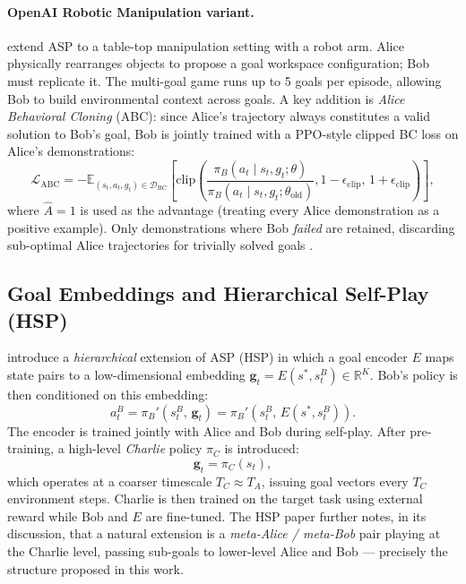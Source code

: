 \documentclass[12pt, a4paper]{article}
\newcommand{\sstar}{s^{*}}
\newcommand{\Enc}{E}
\newcommand{\goalvec}{\mathbf{g}}
\newcommand{\RR}{\mathbb{R}}
\newcommand{\calL}{\mathcal{L}}
\newcommand{\calD}{\mathcal{D}}
\begin{document}
\paragraph{OpenAI Robotic Manipulation variant.}
\citet{plappert2021asymmetric} extend ASP to a table-top manipulation setting with a robot
arm. Alice physically rearranges objects to propose a goal workspace configuration; Bob must
replicate it. The multi-goal game runs up to 5 goals per episode, allowing Bob to build
environmental context across goals. A key addition is \emph{Alice Behavioral Cloning} (ABC):
since Alice's trajectory always constitutes a valid solution to Bob's goal, Bob is jointly
trained with a PPO-style clipped BC loss on Alice's demonstrations:
\begin{equation}
    \calL_{\mathrm{ABC}} = -\mathbb{E}_{(s_t,a_t,g_t)\in\calD_{\mathrm{BC}}}
    \left[
        \mathrm{clip}\!\left(
            \frac{\pi_B(a_t \mid s_t, g_t; \theta)}{\pi_B(a_t \mid s_t, g_t; \theta_{\mathrm{old}})},
            1-\epsilon_{\mathrm{clip}},\, 1+\epsilon_{\mathrm{clip}}
        \right)
    \right], \label{eq:abc}
\end{equation}
where $\hat{A}=1$ is used as the advantage (treating every Alice demonstration as a positive
example). Only demonstrations where Bob \emph{failed} are retained, discarding sub-optimal
Alice trajectories for trivially solved goals \cite{plappert2021asymmetric}.

\subsection{Goal Embeddings and Hierarchical Self-Play (HSP)}
\label{subsec:hsp}

\citet{sukhbaatar2018learning} introduce a \emph{hierarchical} extension of ASP (HSP) in
which a goal encoder $\Enc$ maps state pairs to a low-dimensional embedding
$\goalvec_t = \Enc(\sstar, s_t^B) \in \RR^K$.
Bob's policy is then conditioned on this embedding:
\begin{equation}
    a_t^B = \pi_B'(s_t^B,\, \goalvec_t) = \pi_B'(s_t^B,\, \Enc(\sstar, s_t^B)). \label{eq:bob_enc}
\end{equation}
The encoder is trained jointly with Alice and Bob during self-play. After pre-training, a
high-level \emph{Charlie} policy $\pi_C$ is introduced:
\begin{equation}
    \goalvec_t = \pi_C(s_t), \label{eq:charlie}
\end{equation}
which operates at a coarser timescale $T_C \approx T_A$, issuing goal vectors every $T_C$
environment steps. Charlie is then trained on the target task using external reward while
Bob and $\Enc$ are fine-tuned. The HSP paper further notes, in its discussion, that a natural
extension is a \emph{meta-Alice / meta-Bob} pair playing at the Charlie level, passing
sub-goals to lower-level Alice and Bob — precisely the structure proposed in this work.
\end{document}
